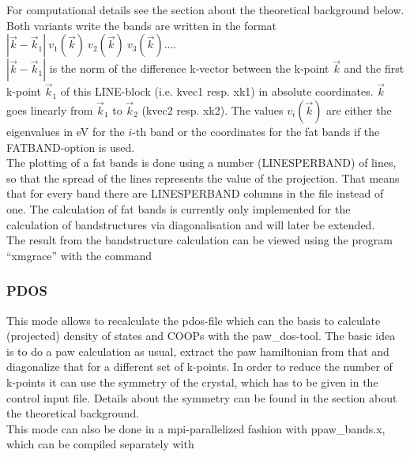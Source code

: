 \documentclass[final,12pt]{article}
\begin{document}
{{{{{{\bigskip{}\bigskip

\noindent
For computational details see the section about
the theoretical background below.\\
Both variants write the bands are written in the format 
$|\vec k-\vec k_1|\ v_1(\vec k)\ v_2(\vec k)\ v_3(\vec k) \ldots $.\\
 $|\vec k-\vec k_1|$ is the norm of the difference k-vector between 
the k-point $\vec k$ and the first k-point $\vec k_1$ of this 
LINE-block (i.e. kvec1 resp. xk1) in absolute coordinates. $\vec k$ 
goes linearly from $\vec k_1$ to $\vec k_2$ (kvec2 resp. xk2).
The values $v_i(\vec k)$ are either the eigenvalues in eV for the 
$i$-th band or the coordinates for the fat bands if the 
FATBAND-option is used.\\
The plotting of a fat bands is done using a number (LINESPERBAND) of lines,
so that the spread of the lines represents the value of the projection. 
That means that for every band there are LINESPERBAND columns in the file 
instead of one. The calculation of fat bands is currently only implemented
for the calculation of bandstructures via diagonalisation and will
later be extended.\\
The result from the bandstructure calculation can be viewed using 
the program ``xmgrace'' with the command

\bigskip{}\bigskip

\subsubsection{PDOS}
This mode allows to recalculate the pdos-file which can the basis to 
calculate (projected) density of states and COOPs with the paw\_dos-tool.
The basic idea is to do a paw calculation as usual, extract the paw 
hamiltonian from that and diagonalize that for a different set of k-points.
In order to reduce the number of k-points it can use the symmetry of the 
crystal, which has to be given in the control input file. Details about 
the symmetry can be found in the section about the theoretical background.
\\
This mode can also be done in a  mpi-parallelized fashion with 
ppaw\_bands.x, which can be compiled separately with 

\bigskip{}\bigskip

}}}}}}
\end{document}
